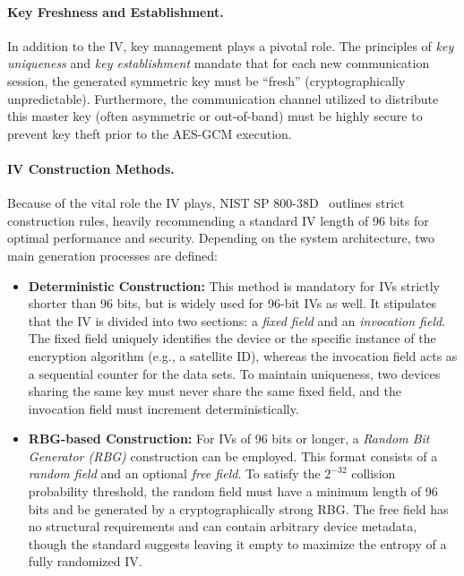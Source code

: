 \documentclass[11pt,a4paper]{report}
\begin{document}
\paragraph{Key Freshness and Establishment.}
In addition to the IV, key management plays a pivotal role. The principles of \textit{key uniqueness} and \textit{key establishment} mandate that for each new communication session, the generated symmetric key must be ``fresh'' (cryptographically unpredictable). 
Furthermore, the communication channel utilized to distribute this master key (often asymmetric or out-of-band) must be highly secure to prevent key theft prior to the AES-GCM execution.

\paragraph{IV Construction Methods.}
Because of the vital role the IV plays, NIST SP 800-38D~\cite{GCM} outlines strict construction rules, heavily recommending a standard IV length of 96 bits for optimal performance and security. 
Depending on the system architecture, two main generation processes are defined:

\begin{itemize}
    \item \textbf{Deterministic Construction:} This method is mandatory for IVs strictly shorter than 96 bits, but is widely used for 96-bit IVs as well. 
    It stipulates that the IV is divided into two sections: a \textit{fixed field} and an \textit{invocation field}. 
    The fixed field uniquely identifies the device or the specific instance of the encryption algorithm (e.g., a satellite ID), whereas the invocation field acts as a sequential counter for the data sets. 
    To maintain uniqueness, two devices sharing the same key must never share the same fixed field, and the invocation field must increment deterministically.
    
    \item \textbf{RBG-based Construction:} For IVs of 96 bits or longer, a \textit{Random Bit Generator (RBG)} construction can be employed. 
    This format consists of a \textit{random field} and an optional \textit{free field}. 
    To satisfy the $2^{-32}$ collision probability threshold, the random field must have a minimum length of 96 bits and be generated by a cryptographically strong RBG. 
    The free field has no structural requirements and can contain arbitrary device metadata, though the standard suggests leaving it empty to maximize the entropy of a fully randomized IV.
\end{itemize}
\end{document}
